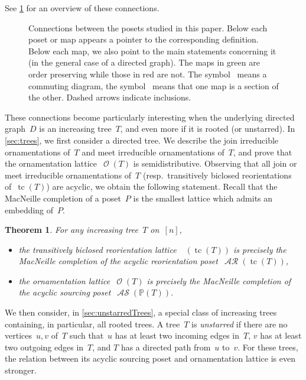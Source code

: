 \documentclass{amsart}
\newtheorem{theorem}{Theorem}[section]
\theoremstyle{definition}
\renewcommand{\c}[1]{\mathcal{#1}} %
\DeclareMathOperator{\tc}{tc} %
\newcommand{\darkblue}{\color{darkblue}} %
\newcommand{\defn}[1]{\textsl{\darkblue #1}} %
\DeclareMathOperator{\Orn}{\c{O}}  %
\DeclareMathOperator{\AReori}{\c{AR}}  %
\DeclareMathOperator{\Rbi}{\c{R}^{bi}}  %
\DeclareMathOperator{\ASour}{\mathcal{AS}}  %
\newcommand{\PP}{\mathbb P} %
\begin{document}
See \cref{fig:allMaps} for an overview of these connections.

\begin{figure}
	\centerline{}
	\caption{Connections between the posets studied in this paper. Below each poset or map appears a pointer to the corresponding definition. Below each map, we also point to the main statements concerning it (in the general case of a directed graph). The maps in green are order preserving while those in red are not. The symbol~\smash{\Large$\circlearrowleft$} means a commuting diagram, the symbol~ means that one map is a section of the other. Dashed arrows indicate inclusions.}
	\label{fig:allMaps}
\end{figure}

\medskip
These connections become particularly interesting when the underlying directed graph~$D$ is an increasing tree~$T$, and even more if it is rooted (or unstarred).
In \cref{sec:trees}, we first consider a directed tree.
We describe the join irreducible ornamentations of~$T$ and meet irreducible ornamentations of~$T$, and prove that the ornamentation lattice~$\Orn(T)$ is semidistributive.
Observing that all join or meet irreducible ornamentations of~$T$ (resp.~transitively biclosed reorientations of~$\tc(T)$) are acyclic, we obtain the following statement.
Recall that the MacNeille completion of a poset~$P$ is the smallest lattice which admits an embedding of~$P$.

\begin{theorem}
\label{thm:main1}
For any increasing tree~$T$ on~$[n]$, 
\begin{itemize}
\item the transitively biclosed reorientation lattice~$\Rbi(\tc(T))$ is precisely the MacNeille completion of the acyclic reorientation poset~$\AReori(\tc(T))$,
\item the ornamentation lattice~$\Orn(T)$ is precisely the MacNeille completion of the acyclic sourcing poset~$\ASour(\PP(T))$.
\end{itemize}
\end{theorem}

We then consider, in \cref{sec:unstarredTrees}, a special class of increasing trees containing, in particular, all rooted trees.
A tree~$T$ is \defn{unstarred} if there are no vertices~$u,v$ of~$T$ such that~$u$ has at least two incoming edges in~$T$, $v$ has at least two outgoing edges in~$T$, and $T$ has a directed path from~$u$ to~$v$.
For these trees, the relation between its acyclic sourcing poset and ornamentation lattice is even stronger.
\end{document}
